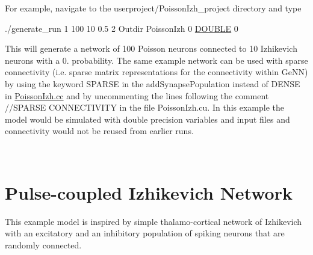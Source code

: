For example, navigate to the {\ttfamily userproject/\+Poisson\+Izh\+\_\+project} directory and type 
\begin{DoxyCode}
./generate\_run 1 100 10 0.5 2 Outdir PoissonIzh 0 \hyperlink{modelSpec_8h_a8747af38b86aa2bbcda2f1b1aa0888c2}{DOUBLE} 0
\end{DoxyCode}
 This will generate a network of 100 Poisson neurons connected to 10 Izhikevich neurons with a 0. probability. The same example network can be used with sparse connectivity (i.\+e. sparse matrix representations for the connectivity within Ge\+N\+N) by using the keyword {\ttfamily S\+P\+A\+R\+S\+E} in the add\+Synapse\+Population instead of {\ttfamily D\+E\+N\+S\+E} in \hyperlink{PoissonIzh_8cc}{Poisson\+Izh.\+cc} and by uncommenting the lines following the comment {\ttfamily //\+S\+P\+A\+R\+S\+E C\+O\+N\+N\+E\+C\+T\+I\+V\+I\+T\+Y} in the file Poisson\+Izh.\+cu. In this example the model would be simulated with double precision variables and input files and connectivity would not be reused from earlier runs.

~\newline
\hypertarget{Examples_ex_izhnetwork}{}\section{Pulse-\/coupled Izhikevich Network}\label{Examples_ex_izhnetwork}
This example model is inspired by simple thalamo-\/cortical network of Izhikevich \cite{izhikevich2003simple} with an excitatory and an inhibitory population of spiking neurons that are randomly connected.

